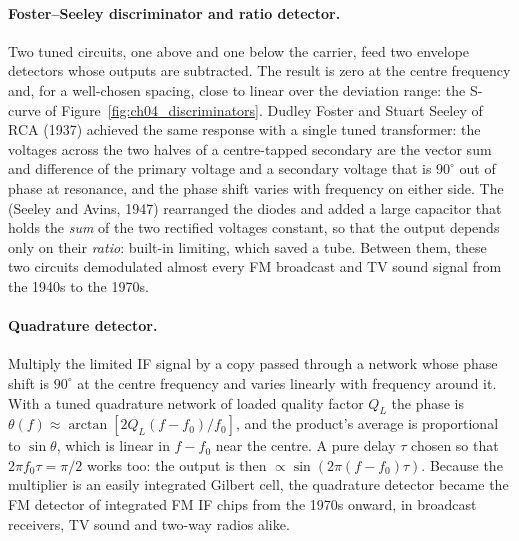 
\paragraph{Foster--Seeley discriminator and ratio detector.} Two tuned circuits, one above and one below
the carrier, feed two envelope detectors whose outputs are subtracted. The result is zero at the centre
frequency and, for a well-chosen spacing, close to linear over the deviation range: the S-curve of
Figure~\ref{fig:ch04_discriminators}. Dudley Foster and Stuart Seeley of RCA (1937) achieved the same
response with a single tuned transformer: the voltages across the two halves of a centre-tapped secondary
are the vector sum and difference of the primary voltage and a secondary voltage that is $90^\circ$ out of
phase at resonance, and the phase shift varies with frequency on either side. The 
(Seeley and Avins, 1947) rearranged the diodes and added a large capacitor that holds the \emph{sum} of the
two rectified voltages constant, so that the output depends only on their \emph{ratio}: built-in limiting,
which saved a tube. Between them, these two circuits demodulated almost every FM broadcast and TV sound
signal from the 1940s to the 1970s.

\paragraph{Quadrature detector.} Multiply the limited IF signal by a copy passed through a network whose
phase shift is $90^\circ$ at the centre frequency and varies linearly with frequency around it. With a tuned
quadrature network of loaded quality factor $Q_L$ the phase is $\theta(f)\approx\arctan[2Q_L(f-f_0)/f_0]$,
and the product's average is proportional to $\sin\theta$, which is linear in $f-f_0$ near the centre. A
pure delay $\tau$ chosen so that $2\pi f_0\tau=\pi/2$ works too: the output is then
$\propto\sin(2\pi(f-f_0)\tau)$. Because the multiplier is an easily integrated Gilbert cell, the quadrature
detector became the FM detector of integrated FM IF chips from the 1970s onward, in broadcast receivers, TV
sound and two-way radios alike.


